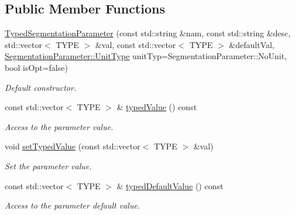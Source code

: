 \subsection*{Public Member Functions}
\begin{DoxyCompactItemize}
\item 
\hyperlink{class_d_d4hep_1_1_d_d_segmentation_1_1_typed_segmentation_parameter_3_01std_1_1vector_3_01_t_y_p_e_01_4_01_4_a4deba5d43284deab4fba1c05f0cbb563}{TypedSegmentationParameter} (const std::string \&nam, const std::string \&desc, std::vector$<$ TYPE $>$ \&val, const std::vector$<$ TYPE $>$ \&defaultVal, \hyperlink{class_d_d4hep_1_1_d_d_segmentation_1_1_segmentation_parameter_a36f5f8b8d812b2a2b81363377565d8d4}{SegmentationParameter::UnitType} unitTyp=SegmentationParameter::NoUnit, bool isOpt=false)
\begin{DoxyCompactList}\small\item\em Default constructor. \item\end{DoxyCompactList}\item 
const std::vector$<$ TYPE $>$ \& \hyperlink{class_d_d4hep_1_1_d_d_segmentation_1_1_typed_segmentation_parameter_3_01std_1_1vector_3_01_t_y_p_e_01_4_01_4_a484ad3acbc0f3af176751bfac375ad42}{typedValue} () const 
\begin{DoxyCompactList}\small\item\em Access to the parameter value. \item\end{DoxyCompactList}\item 
void \hyperlink{class_d_d4hep_1_1_d_d_segmentation_1_1_typed_segmentation_parameter_3_01std_1_1vector_3_01_t_y_p_e_01_4_01_4_ab26ff43253babc240b2f92ff02b59d3b}{setTypedValue} (const std::vector$<$ TYPE $>$ \&val)
\begin{DoxyCompactList}\small\item\em Set the parameter value. \item\end{DoxyCompactList}\item 
const std::vector$<$ TYPE $>$ \& \hyperlink{class_d_d4hep_1_1_d_d_segmentation_1_1_typed_segmentation_parameter_3_01std_1_1vector_3_01_t_y_p_e_01_4_01_4_a65101cc060d43531b3db64c2e959e93e}{typedDefaultValue} () const 
\begin{DoxyCompactList}\small\item\em Access to the parameter default value. \item\end{DoxyCompactList}\item 

\end{DoxyCompactItemize}
